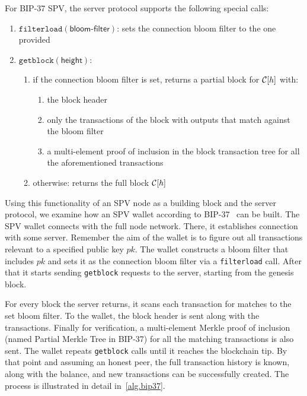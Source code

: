 For BIP-37 SPV, the server protocol supports the following special calls:
\begin{enumerate}
    \item $\texttt{filterload}(\textsf{bloom-filter})$: sets the connection bloom filter to the one provided
    \item $\texttt{getblock}(\textsf{height})$: 
    \begin{enumerate}
        \item if the connection bloom filter is set, returns a partial block for $\mathcal{C}[h]$ with:
        \begin{enumerate}
            \item the block header
            \item only the transactions of the block with outputs that match against the bloom filter
            \item a multi-element proof of inclusion in the block transaction tree for all the aforementioned transactions
        \end{enumerate}
        \item otherwise: returns the full block $\mathcal{C}[h]$
    \end{enumerate}
\end{enumerate}

Using this functionality of an SPV node as a building block and the server protocol, we examine how an SPV wallet according to BIP-37~\cite{bip37} can be built. The SPV wallet connects with the full node network. There, it establishes connection with some server. Remember the aim of the wallet is to figure out all transactions relevant to a specified public key $pk$. The wallet constructs a bloom filter that includes $pk$ and sets it as the connection bloom filter via a \texttt{filterload} call. After that it starts sending \texttt{getblock} requests to the server, starting from the genesis block.

For every block the server returns, it scans each transaction for matches to the set bloom filter. To the wallet, the block header is sent along with the transactions. Finally for verification, a multi-element Merkle proof of inclusion (named Partial Merkle Tree in BIP-37) for all the matching transactions is also sent. The wallet repeats \texttt{getblock} calls until it reaches the blockchain tip. By that point and assuming an honest peer, the full transaction history is known, along with the balance, and new transactions can be successfully created. The process is illustrated in detail in~\cref{alg.bip37}.


